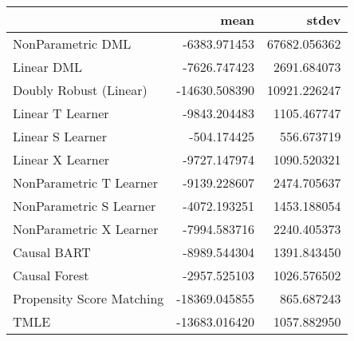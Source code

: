 \begin{tabular}{lrr}
\toprule
{} &          mean &         stdev \\
\midrule
NonParametric DML         &  -6383.971453 &  67682.056362 \\
Linear DML                &  -7626.747423 &   2691.684073 \\
Doubly Robust (Linear)    & -14630.508390 &  10921.226247 \\
Linear T Learner          &  -9843.204483 &   1105.467747 \\
Linear S Learner          &   -504.174425 &    556.673719 \\
Linear X Learner          &  -9727.147974 &   1090.520321 \\
NonParametric T Learner   &  -9139.228607 &   2474.705637 \\
NonParametric S Learner   &  -4072.193251 &   1453.188054 \\
NonParametric X Learner   &  -7994.583716 &   2240.405373 \\
Causal BART               &  -8989.544304 &   1391.843450 \\
Causal Forest             &  -2957.525103 &   1026.576502 \\
Propensity Score Matching & -18369.045855 &    865.687243 \\
TMLE                      & -13683.016420 &   1057.882950 \\
\bottomrule
\end{tabular}
